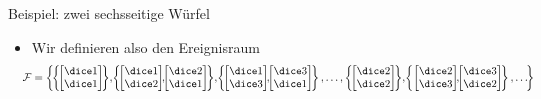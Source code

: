 \begin{frame}{Beispiel: zwei sechsseitige Würfel}
\begin{itemize}
\begin{gather*}
\begin{bmatrix}
          \dice1\\\dice2
        \end{bmatrix}
        ,\begin{bmatrix}
          \dice2\\\dice1
        \end{bmatrix}\right\}
    \end{gather*}
  \item<3-> Wir definieren also den Ereignisraum
    \begin{gather*}
      \hspace*{-1em}
      \ereignisraum = \left\{\!
        \left\{\!
          \begin{bmatrix}
            \dice1\\\dice1
          \end{bmatrix}
          \!\right\}\!,\!
        \left\{\!
          \begin{bmatrix}
            \dice1\\\dice2
          \end{bmatrix}
          \!\!,\!\!
          \begin{bmatrix}
            \dice2\\\dice1
          \end{bmatrix}
          \!\right\}\!,\!
        \left\{\!
          \begin{bmatrix}
            \dice1\\\dice3
          \end{bmatrix}
          \!\!,\!\!
          \begin{bmatrix}
            \dice3\\\dice1
          \end{bmatrix}
          \!\right\}
        ,\dots,
        \left\{\!
          \begin{bmatrix}
            \dice2\\\dice2
          \end{bmatrix}
          \!\right\}
        \!,\!
        \left\{
          \begin{bmatrix}
            \dice2\\\dice3
          \end{bmatrix}
          \!\!,\!\!
          \begin{bmatrix}
            \dice3\\\dice2
          \end{bmatrix}
          \!\right\},\dots        
        \!\right\}
    \end{gather*}
    
  \end{itemize}
\end{frame}

